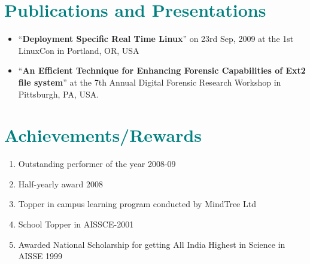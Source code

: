 \documentclass[letterpaper,11pt]{article}
\newcommand{\resumeSubHeadingListStart}{\begin{itemize}[leftmargin=*]}
\newcommand{\resumeSubHeadingListEnd}{\end{itemize}}
\begin{document}
\section{\textcolor{teal}{Publications and Presentations}}
  \resumeSubHeadingListStart
    \item {“\textbf{Deployment Specific Real Time Linux}” on 23rd Sep, 2009 at the 1st LinuxCon in Portland, OR, USA}
    \item  {“\textbf{An Efficient Technique for Enhancing Forensic Capabilities of Ext2 file system}” at the 7th Annual Digital Forensic Research Workshop in Pittsburgh, PA, USA.}
  \resumeSubHeadingListEnd
  
  

\section{\textcolor{teal}{Achievements/Rewards}}
  \begin{enumerate}
    \item{Outstanding performer of the year 2008-09}
    \item{Half-yearly award 2008}
    \item{Topper in campus learning program conducted by MindTree Ltd}
    \item{School Topper in AISSCE-2001}
    \item{Awarded National Scholarship for getting All India Highest in Science in AISSE 1999}  
    \end{enumerate}


\end{document}
